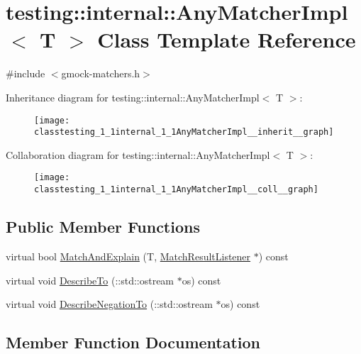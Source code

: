 \hypertarget{classtesting_1_1internal_1_1AnyMatcherImpl}{}\section{testing\+:\+:internal\+:\+:Any\+Matcher\+Impl$<$ T $>$ Class Template Reference}
\label{classtesting_1_1internal_1_1AnyMatcherImpl}


{\ttfamily \#include $<$gmock-\/matchers.\+h$>$}



Inheritance diagram for testing\+:\+:internal\+:\+:Any\+Matcher\+Impl$<$ T $>$\+:\nopagebreak
\begin{figure}[H]
\begin{center}
\leavevmode
\texttt{[image: classtesting\_1\_1internal\_1\_1AnyMatcherImpl\_\_inherit\_\_graph]}
\end{center}
\end{figure}


Collaboration diagram for testing\+:\+:internal\+:\+:Any\+Matcher\+Impl$<$ T $>$\+:\nopagebreak
\begin{figure}[H]
\begin{center}
\leavevmode
\texttt{[image: classtesting\_1\_1internal\_1\_1AnyMatcherImpl\_\_coll\_\_graph]}
\end{center}
\end{figure}
\subsection*{Public Member Functions}
\begin{DoxyCompactItemize}
\item 
virtual bool \hyperlink{classtesting_1_1internal_1_1AnyMatcherImpl_a03fe8956cfe9827b0ceacbd130fb88c1}{Match\+And\+Explain} (T, \hyperlink{classtesting_1_1MatchResultListener}{Match\+Result\+Listener} $\ast$) const 
\item 
virtual void \hyperlink{classtesting_1_1internal_1_1AnyMatcherImpl_ae68a082e0c85a0b6f3502698e60333a8}{Describe\+To} (\+::std\+::ostream $\ast$os) const 
\item 
virtual void \hyperlink{classtesting_1_1internal_1_1AnyMatcherImpl_ae403b0e2cf75db076e3465c579a2175b}{Describe\+Negation\+To} (\+::std\+::ostream $\ast$os) const 
\end{DoxyCompactItemize}


\subsection{Member Function Documentation}
